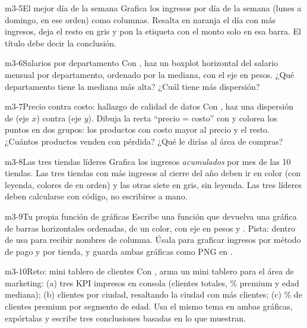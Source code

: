\begin{ejercicio}{m3-5}{El mejor día de la semana}
Grafica los ingresos por día de la semana (lunes a domingo, en ese orden)
como columnas. Resalta en naranja el día con más ingresos, deja el resto en
gris y pon la etiqueta con el monto solo en esa barra. El título debe decir
la conclusión.
\end{ejercicio}

\begin{ejercicio}{m3-6}{Salarios por departamento}
Con , haz un boxplot horizontal del salario mensual
por departamento, ordenado por la mediana, con el eje en pesos. ¿Qué
departamento tiene la mediana más alta? ¿Cuál tiene más dispersión?
\end{ejercicio}

\begin{ejercicio}{m3-7}{Precio contra costo: hallazgo de calidad de datos}
Con , haz una dispersión de  (eje $x$)
contra  (eje $y$). Dibuja la recta ``precio =
costo'' con  y colorea los puntos en dos grupos: los
productos con costo mayor al precio y el resto. ¿Cuántos productos venden
con pérdida? ¿Qué le dirías al área de compras?
\end{ejercicio}

\begin{ejercicio}{m3-8}{Las tres tiendas líderes}
Grafica los ingresos \emph{acumulados} por mes de las 10 tiendas. Las tres
tiendas con más ingresos al cierre del año deben ir en color (con leyenda,
colores de  en orden) y las otras siete en gris, sin
leyenda. Las tres líderes deben calcularse con código, no escribirse a mano.
\end{ejercicio}

\begin{ejercicio}{m3-9}{Tu propia función de gráficas}
Escribe una función  que devuelva una gráfica de barras horizontales ordenadas, de un
color, con eje en pesos y . Pista: dentro de
 usa  para recibir nombres de
columna. Úsala para graficar ingresos por método de pago y por tienda, y
guarda ambas gráficas como PNG en .
\end{ejercicio}

\begin{ejercicio}{m3-10}{Reto: mini tablero de clientes}
Con , arma un mini tablero para el área de
marketing: (a) tres KPI impresos en consola (clientes totales, \% premium y
edad mediana); (b) clientes por ciudad, resaltando la ciudad con más
clientes; (c) \% de clientes premium por segmento de edad. Usa el mismo
tema en ambas gráficas, expórtalas y escribe tres conclusiones basadas en
lo que muestran.
\end{ejercicio}
